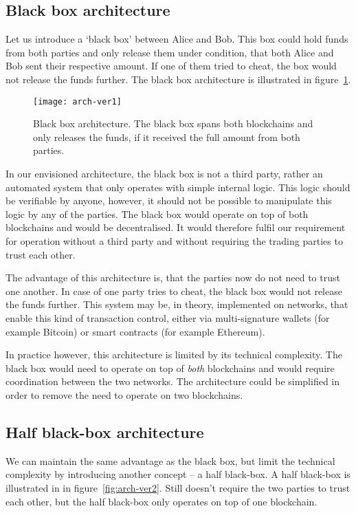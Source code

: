 \subsection{Black box architecture}
Let us introduce a `black box' between Alice and Bob. This box could hold funds from both parties and only release them under condition, that both Alice and Bob sent their respective amount. If one of them tried to cheat, the box would not release the funds further. The black box architecture is illustrated in figure~\ref{fig:arch-ver1}.
% 
\begin{figure}[ht]
    \centering
    \texttt{[image: arch-ver1]}
    \caption{Black box architecture. The black box spans both blockchains and only releases the funds, if it received the full amount from both parties.}
    \label{fig:arch-ver1}
\end{figure}

In our envisioned architecture, the black box is not a third party, rather an automated system that only operates with simple internal logic. This logic should be verifiable by anyone, however, it should not be possible to manipulate this logic by any of the parties. The black box would operate on top of both blockchains and would be decentralised. It would therefore fulfil our requirement for operation without a third party and without requiring the trading parties to trust each other.

The advantage of this architecture is, that the parties now do not need to trust one another. In case of one party tries to cheat, the black box would not release the funds further. This system may be, in theory, implemented on networks, that enable this kind of transaction control, either via multi-signature wallets (for example Bitcoin) or smart contracts (for example Ethereum).

In practice however, this architecture is limited by its technical complexity. The black box would need to operate on top of \textit{both} blockchains and would require coordination between the two networks. The architecture could be simplified in order to remove the need to operate on two blockchains.

\subsection{Half black-box architecture}
We can maintain the same advantage as the black box, but limit the technical complexity by introducing another concept -- a half black-box. A half black-box is illustrated in in figure~\ref{fig:arch-ver2}. Still doesn't require the two parties to trust each other, but the half black-box only operates on top of one blockchain.

